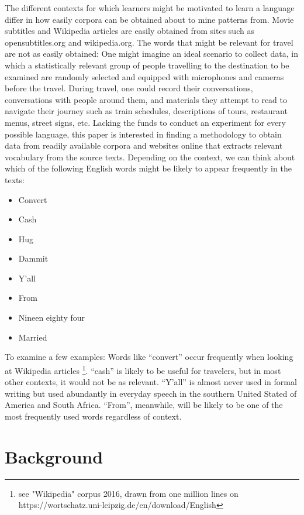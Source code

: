 The different contexts for which learners might be motivated to learn a language differ in how easily corpora can be obtained about to mine patterns from. Movie subtitles and Wikipedia articles are easily obtained from sites such as opensubtitles.org and wikipedia.org. The words that might be relevant for travel are not as easily obtained: One might imagine an ideal scenario to collect data, in which a statistically relevant group of people travelling to the destination to be examined are randomly selected and equipped with microphones and cameras before the travel. During travel, one could record their conversations, conversations with people around them, and materials they attempt to read to navigate their journey such as train schedules, descriptions of tours, restaurant menus, street signs, etc. Lacking the funds to conduct an experiment for every possible language, this paper is interested in finding a methodology to obtain data from readily available corpora and websites online that extracts relevant vocabulary from the source texts.
Depending on the context, we can think about which of the following English words might be likely to appear frequently in the texts:

\begin{itemize}
	\item Convert
	\item Cash
	\item Hug
	\item Dammit
	\item Y'all
	\item From
	\item Nineen eighty four
	\item Married
\end{itemize}

To examine a few examples: Words like “convert” occur frequently when looking at Wikipedia articles \footnote{see "Wikipedia" corpus 2016, drawn from one million lines on https://wortschatz.uni-leipzig.de/en/download/English}. “cash” is likely to be useful for travelers, but in most other contexts, it would not be as relevant. “Y’all” is almost never used in formal writing but used abundantly in everyday speech in the southern United Stated of America and South Africa. “From”, meanwhile, will be likely to be one of the most frequently used words regardless of context.

\section{Background}
